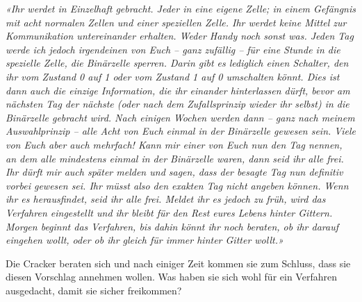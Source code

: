 \textit{«Ihr werdet in Einzelhaft gebracht. Jeder in eine eigene Zelle; in einem
Gefängnis mit acht normalen Zellen und einer speziellen Zelle. Ihr werdet keine
Mittel zur Kommunikation untereinander erhalten. Weder Handy noch sonst
was. Jeden Tag werde ich jedoch irgendeinen von Euch – ganz zufällig – für eine
Stunde in die spezielle Zelle, die Binärzelle sperren. Darin gibt es lediglich einen
Schalter, den ihr vom Zustand 0 auf 1 oder vom Zustand 1 auf 0 umschalten
könnt. Dies ist dann auch die einzige Information, die ihr einander hinterlassen
dürft, bevor am nächsten Tag der nächste (oder nach dem Zufallsprinzip wieder
ihr selbst) in die Binärzelle gebracht wird. Nach einigen Wochen werden dann –
ganz nach meinem Auswahlprinzip – alle Acht von Euch einmal in der Binärzelle
gewesen sein. Viele von Euch aber auch mehrfach! Kann mir einer von Euch nun
den Tag nennen, an dem alle mindestens einmal in der Binärzelle waren, dann
seid ihr alle frei. Ihr dürft mir auch später melden und sagen, dass der besagte
Tag nun definitiv vorbei gewesen sei. Ihr müsst also den exakten Tag nicht
angeben können. Wenn ihr es herausfindet, seid ihr alle frei. Meldet ihr es
jedoch zu früh, wird das Verfahren eingestellt und ihr bleibt für den Rest eures
Lebens hinter Gittern. Morgen beginnt das Verfahren, bis dahin könnt ihr noch
beraten, ob ihr darauf eingehen wollt, oder ob ihr gleich für immer hinter Gitter
wollt.»}

Die Cracker beraten sich und nach einiger Zeit kommen sie zum Schluss, dass
sie diesen Vorschlag annehmen wollen. Was haben sie sich wohl für ein
Verfahren ausgedacht, damit sie sicher freikommen?

\TNTeop{}

